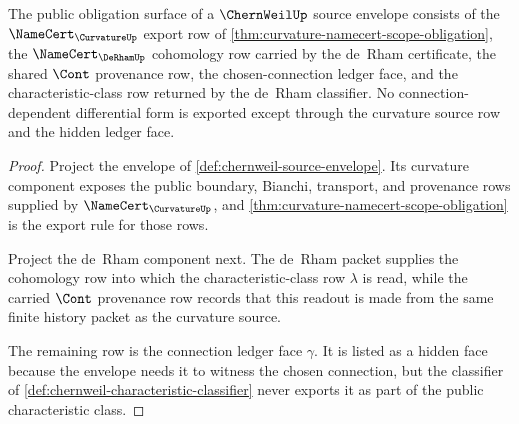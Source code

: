 \begin{theorem}
\label{thm:chernweil-curvature-derham-obligation-surface}
The public obligation surface of a $\ChernWeilUp$ source envelope consists of the $\NameCert_{\CurvatureUp}$ export row of \autoref{thm:curvature-namecert-scope-obligation}, the $\NameCert_{\DeRhamUp}$ cohomology row carried by the de~Rham certificate, the shared $\Cont$ provenance row, the chosen-connection ledger face, and the characteristic-class row returned by the de~Rham classifier. No connection-dependent differential form is exported except through the curvature source row and the hidden ledger face.
\end{theorem}
\begin{proof}
Project the envelope of \autoref{def:chernweil-source-envelope}. Its curvature component exposes the public boundary, Bianchi, transport, and provenance rows supplied by $\NameCert_{\CurvatureUp}$, and \autoref{thm:curvature-namecert-scope-obligation} is the export rule for those rows.

Project the de~Rham component next. The de~Rham packet supplies the cohomology row into which the characteristic-class row $\lambda$ is read, while the carried $\Cont$ provenance row records that this readout is made from the same finite history packet as the curvature source.

The remaining row is the connection ledger face $\gamma$. It is listed as a hidden face because the envelope needs it to witness the chosen connection, but the classifier of \autoref{def:chernweil-characteristic-classifier} never exports it as part of the public characteristic class.
\end{proof}


